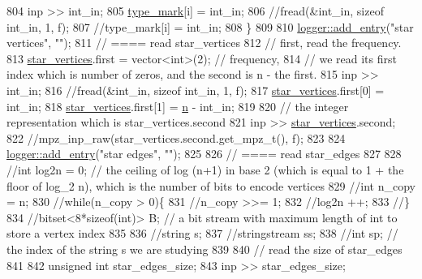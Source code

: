 \begin{DoxyCode}
804     inp >> int\_in;
805     \hyperlink{classmarked__graph__compressed_a86b00223525703e973415cbc9c94da68}{type\_mark}[i] = int\_in;
806     \textcolor{comment}{//fread(&int\_in, sizeof int\_in, 1, f);}
807     \textcolor{comment}{//type\_mark[i] = int\_in;}
808   \}
809 
810   \hyperlink{classlogger_a710163deb17bc81f70d53d285b8ac9ac}{logger::add\_entry}(\textcolor{stringliteral}{"star vertices"}, \textcolor{stringliteral}{""});
811   \textcolor{comment}{// ==== read star\_vertices}
812   \textcolor{comment}{// first, read the frequency.}
813   \hyperlink{classmarked__graph__compressed_a7a4ced4586e2e353f9076bd447df5208}{star\_vertices}.first = vector<int>(2); \textcolor{comment}{// frequency,}
814   \textcolor{comment}{// we read its first index which is number of zeros, and the second is n - the first.}
815   inp >> int\_in;
816   \textcolor{comment}{//fread(&int\_in, sizeof int\_in, 1, f);}
817   \hyperlink{classmarked__graph__compressed_a7a4ced4586e2e353f9076bd447df5208}{star\_vertices}.first[0] = int\_in;
818   \hyperlink{classmarked__graph__compressed_a7a4ced4586e2e353f9076bd447df5208}{star\_vertices}.first[1] = \hyperlink{classmarked__graph__compressed_a8d841016ddb11cfd33748c8deb6277ba}{n} - int\_in;
819 
820   \textcolor{comment}{// the integer representation which is star\_vertices.second}
821   inp >> \hyperlink{classmarked__graph__compressed_a7a4ced4586e2e353f9076bd447df5208}{star\_vertices}.second;
822   \textcolor{comment}{//mpz\_inp\_raw(star\_vertices.second.get\_mpz\_t(), f);}
823 
824   \hyperlink{classlogger_a710163deb17bc81f70d53d285b8ac9ac}{logger::add\_entry}(\textcolor{stringliteral}{"star edges"}, \textcolor{stringliteral}{""});
825 
826   \textcolor{comment}{// ==== read star\_edges}
827 
828   \textcolor{comment}{//int log2n = 0; // the ceiling of log (n+1) in base 2 (which is equal to 1 + the floor of log\_2 n),
       which is the number of bits to encode vertices}
829   \textcolor{comment}{//int n\_copy = n;}
830   \textcolor{comment}{//while(n\_copy > 0)\{}
831   \textcolor{comment}{//n\_copy >>= 1;}
832   \textcolor{comment}{//log2n ++;}
833   \textcolor{comment}{//\}}
834   \textcolor{comment}{//bitset<8*sizeof(int)> B; // a bit stream with maximum length of int to store a vertex index}
835 
836   \textcolor{comment}{//string s;}
837   \textcolor{comment}{//stringstream ss;}
838   \textcolor{comment}{//int sp; // the index of the string s we are studying }
839 
840   \textcolor{comment}{// read the size of star\_edges}
841 
842   \textcolor{keywordtype}{unsigned} \textcolor{keywordtype}{int} star\_edges\_size;
843   inp >> star\_edges\_size;

\end{DoxyCode}
